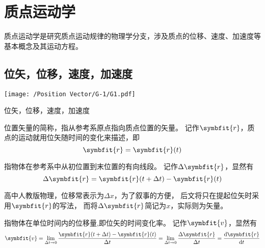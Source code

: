 
\chapter{质点运动学}
质点运动学是研究质点运动规律的物理学分支，涉及质点的位移、速度、加速度等基本概念及其运动方程。



\section{位矢，位移，速度，加速度}

\begin{marginfigure}[4.5cm]
    \texttt{[image: /Position Vector/G-1/G1.pdf]}
    \caption[Position vector]{
        位矢，位移，速度，加速度\\
        }
    \label{fig:Position Vector_G1}
\end{marginfigure}

位置矢量的简称，指从参考系原点指向质点位置的矢量。
记作$\symbfit{r}$，质点的运动就用位矢随时间的变化来描述，即
$$
\symbfit{r}= \symbfit{r}(t)
$$

指物体在参考系中从初位置到末位置的有向线段。
记作$\Delta \symbfit{r}$，显然有
$$
\Delta \symbfit{r} = \symbfit{r}(t+\Delta t) - \symbfit{r}(t)
$$

{\small
高中人教版物理，位移常表示为$\Delta x$，为了叙事的方便，
后文将只在提起位矢时采用$\symbfit{r}$的写法，
而将$\Delta \symbfit{r}$简记为$x$，实际则为矢量。
}
\vspace{1em}

指物体在单位时间内的位移量,即位矢的时间变化率。
记作$\symbfit{v}$，显然有
$$
\symbfit{v} = \lim_{\Delta t \to 0} \frac{\symbfit{r}(t+\Delta t) - \symbfit{r}(t)}{\Delta t}
= \lim_{\Delta t \to 0} \frac{\Delta \symbfit{r}}{\Delta t}
= \frac{\textup{d} \symbfit{r}}{\textup{d}t}
$$

